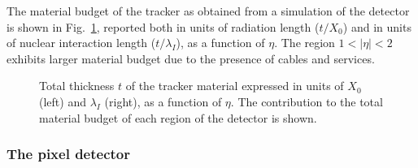 The material budget of the tracker as obtained from a simulation of the detector is shown in Fig.~\ref{fig:material_budget}, reported both in units of radiation length ($t/X_0$) and in units of nuclear interaction length ($t/\lambda_I$), as a function of $\eta$. The region $1 < |\eta| < 2$ exhibits larger material budget due to the presence of cables and services.
\begin{figure}[htb]
\centering
{}
\caption{Total thickness $t$ of the tracker material expressed in units of $X_0$ (left) and $\lambda_I$ (right), as a function of $\eta$. The contribution to the total material budget of each region of the detector is shown.}\label{fig:material_budget}
\end{figure}

\subsubsection{The pixel detector}

